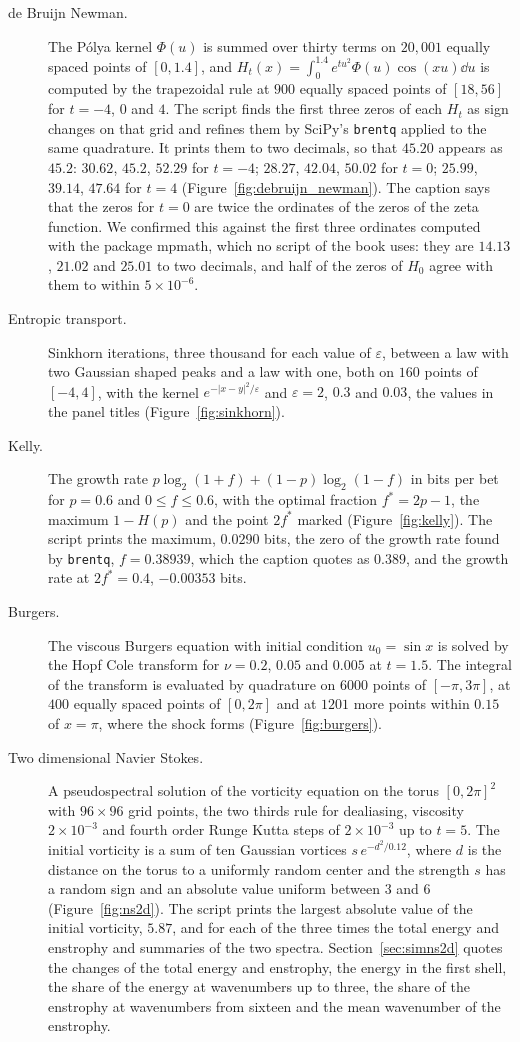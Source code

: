 \begin{description}
\item[de Bruijn Newman.] The P\'olya kernel $\Phi(u)$ is summed over thirty terms on $20{,}001$ equally spaced points of $[0,1.4]$, and $H_t(x)=\int_0^{1.4}e^{tu^2}\Phi(u)\cos(xu)\dd u$ is computed by the trapezoidal rule at $900$ equally spaced points of $[18,56]$ for $t=-4$, $0$ and $4$. The script finds the first three zeros of each $H_t$ as sign changes on that grid and refines them by SciPy's \texttt{brentq} applied to the same quadrature. It prints them to two decimals, so that $45.20$ appears as $45.2$: $30.62$, $45.2$, $52.29$ for $t=-4$; $28.27$, $42.04$, $50.02$ for $t=0$; $25.99$, $39.14$, $47.64$ for $t=4$ (Figure~\ref{fig:debruijn_newman}). The caption says that the zeros for $t=0$ are twice the ordinates of the zeros of the zeta function. We confirmed this against the first three ordinates computed with the package mpmath, which no script of the book uses: they are $14.13$, $21.02$ and $25.01$ to two decimals, and half of the zeros of $H_0$ agree with them to within $5\times10^{-6}$.
\item[Entropic transport.] Sinkhorn iterations, three thousand for each value of $\varepsilon$, between a law with two Gaussian shaped peaks and a law with one, both on $160$ points of $[-4,4]$, with the kernel $e^{-|x-y|^2/\varepsilon}$ and $\varepsilon=2$, $0.3$ and $0.03$, the values in the panel titles (Figure~\ref{fig:sinkhorn}).
\item[Kelly.] The growth rate $p\log_2(1+f)+(1-p)\log_2(1-f)$ in bits per bet for $p=0.6$ and $0\le f\le0.6$, with the optimal fraction $f^*=2p-1$, the maximum $1-H(p)$ and the point $2f^*$ marked (Figure~\ref{fig:kelly}). The script prints the maximum, $0.0290$ bits, the zero of the growth rate found by \texttt{brentq}, $f=0.38939$, which the caption quotes as $0.389$, and the growth rate at $2f^*=0.4$, $-0.00353$ bits.
\item[Burgers.] The viscous Burgers equation with initial condition $u_0=\sin x$ is solved by the Hopf Cole transform for $\nu=0.2$, $0.05$ and $0.005$ at $t=1.5$. The integral of the transform is evaluated by quadrature on $6000$ points of $[-\pi,3\pi]$, at $400$ equally spaced points of $[0,2\pi]$ and at $1201$ more points within $0.15$ of $x=\pi$, where the shock forms (Figure~\ref{fig:burgers}).
\item[Two dimensional Navier Stokes.] A pseudospectral solution of the vorticity equation on the torus $[0,2\pi]^2$ with $96\times96$ grid points, the two thirds rule for dealiasing, viscosity $2\times10^{-3}$ and fourth order Runge Kutta steps of $2\times10^{-3}$ up to $t=5$. The initial vorticity is a sum of ten Gaussian vortices $s\,e^{-d^2/0.12}$, where $d$ is the distance on the torus to a uniformly random center and the strength $s$ has a random sign and an absolute value uniform between $3$ and $6$ (Figure~\ref{fig:ns2d}). The script prints the largest absolute value of the initial vorticity, $5.87$, and for each of the three times the total energy and enstrophy and summaries of the two spectra. Section~\ref{sec:simns2d} quotes the changes of the total energy and enstrophy, the energy in the first shell, the share of the energy at wavenumbers up to three, the share of the enstrophy at wavenumbers from sixteen and the mean wavenumber of the enstrophy.

\end{description}
